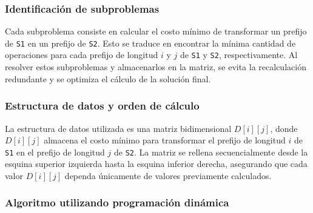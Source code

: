 \subsubsection{Identificación de subproblemas}

Cada subproblema consiste en calcular el costo mínimo de transformar un prefijo de \texttt{S1} en un prefijo de \texttt{S2}. Esto se traduce en encontrar la mínima cantidad de operaciones para cada prefijo de longitud \( i \) y \( j \) de \texttt{S1} y \texttt{S2}, respectivamente. Al resolver estos subproblemas y almacenarlos en la matriz, se evita la recalculación redundante y se optimiza el cálculo de la solución final.

\subsubsection{Estructura de datos y orden de cálculo}

La estructura de datos utilizada es una matriz bidimensional \( D[i][j] \), donde \( D[i][j] \) almacena el costo mínimo para transformar el prefijo de longitud \( i \) de \texttt{S1} en el prefijo de longitud \( j \) de \texttt{S2}. La matriz se rellena secuencialmente desde la esquina superior izquierda hasta la esquina inferior derecha, asegurando que cada valor \( D[i][j] \) dependa únicamente de valores previamente calculados.

\subsubsection{Algoritmo utilizando programación dinámica}

